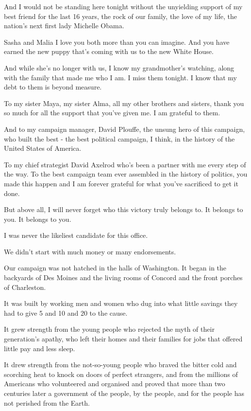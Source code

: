 \documentclass[12pt,a4paper,twocolumn]{article}
\begin{document}
And I would not be standing here tonight without the unyielding support of my best friend for the last 16 years, the rock of
our family, the love of my life, the nation's next first lady Michelle Obama.

Sasha and Malia I love you both more than you can imagine. And you have earned the new puppy that's coming with us to the
new White House.

And while she's no longer with us, I know my grandmother's watching, along with the family that made me who I am. I miss
them tonight. I know that my debt to them is beyond measure.

To my sister Maya, my sister Alma, all my other brothers and sisters, thank you so much for all the support that you've
given me. I am grateful to them.

And to my campaign manager, David Plouffe, the unsung hero of this campaign, who built the best - the best political
campaign, I think, in the history of the United States of America.

To my chief strategist David Axelrod who's been a partner with me every step of the way. To the best campaign team ever
assembled in the history of politics, you made this happen and I am forever grateful for what you've sacrificed to get it
done.

But above all, I will never forget who this victory truly belongs to. It belongs to you. It belongs to you.

I was never the likeliest candidate for this office.

We didn't start with much money or many endorsements.

Our campaign was not hatched in the halls of Washington. It began in the backyards of Des Moines and the living rooms of
Concord and the front porches of Charleston.

It was built by working men and women who dug into what little savings they had to give 5 and 10 and 20 to the cause.

It grew strength from the young people who rejected the myth of their generation's apathy, who left their homes and their
families for jobs that offered little pay and less sleep.

It drew strength from the not-so-young people who braved the bitter cold and scorching heat to knock on doors of perfect
strangers, and from the millions of Americans who volunteered and organised and proved that more than two centuries later a
government of the people, by the people, and for the people has not perished from the Earth.
\end{document}

